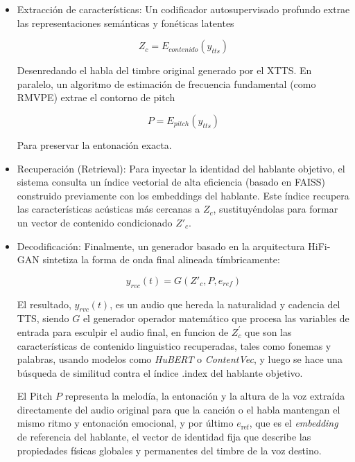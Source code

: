 \documentclass[conference]{IEEEtran}
\begin{document}
\begin{itemize}
	\item Extracción de características: Un codificador autosupervisado profundo extrae las representaciones semánticas y fonéticas latentes 
	
	\begin{equation}
	Z_c = E_{contenido}(y_{tts})	
	\end{equation}
	
	Desenredando el habla del timbre original generado por el XTTS. En paralelo, un algoritmo de estimación de frecuencia fundamental (como RMVPE) extrae el contorno de pitch 
	
	\begin{equation}
		P = E_{pitch}(y_{tts})
	\end{equation} 
	
	Para preservar la entonación exacta.
	
	\item Recuperación (Retrieval): Para inyectar la identidad del hablante objetivo, el sistema consulta un índice vectorial de alta eficiencia (basado en FAISS) construido previamente con los embeddings del hablante. Este índice recupera las características acústicas más cercanas a $Z_c$, sustituyéndolas para formar un vector de contenido condicionado $Z'_c$.
	
	\item Decodificación: Finalmente, un generador basado en la arquitectura HiFi-GAN sintetiza la forma de onda final alineada tímbricamente:
	
	\begin{equation}
	y_{rvc}(t) = G(Z'_c, P, e_{ref})
	\end{equation}
	
	El resultado, $y_{rvc}(t)$, es un audio que hereda la naturalidad y cadencia del TTS, siendo $G$ el generador  operador matemático que procesa las variables de entrada para esculpir el audio final, en funcion de $Z_{c}^{\prime}$  que son las características de contenido linguistico recuperadas, tales como fonemas y palabras, usando modelos como \textit{HuBERT} o \textit{ContentVec}, y luego se hace una búsqueda de similitud contra el índice .index del hablante objetivo.
	 
	
El Pitch \(P\) representa la melodía, la entonación y la altura de la voz extraída directamente del audio original para que la canción o el habla mantengan el mismo ritmo y entonación emocional, y por último  \(e_{\text{ref}}\), que es el \textit{embedding} de referencia del hablante, el vector de identidad fija que describe las propiedades físicas globales y permanentes del timbre de la voz destino.
	
	
	
	
	
	
\end{itemize}
\end{document}
